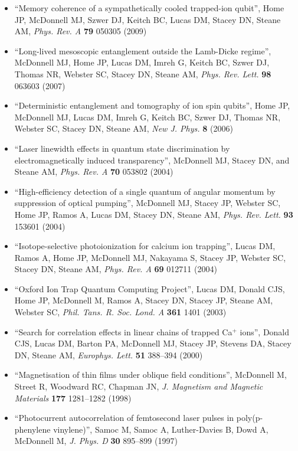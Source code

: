 \documentclass[10pt,a4paper]{article}
\begin{document}
\begin{itemize}
  \item ``Memory coherence of a sympathetically cooled trapped-ion
    qubit'', Home JP, McDonnell MJ, Szwer DJ, Keitch BC, Lucas DM, Stacey DN,
    Steane AM, \textit{Phys. Rev. A} \textbf{79} 050305 (2009)
  \item ``Long-lived mesoscopic entanglement outside the Lamb-Dicke
    regime'', McDonnell MJ, Home JP, Lucas DM, Imreh G, Keitch BC, Szwer DJ,
    Thomas NR, Webster SC, Stacey DN, Steane AM, \textit{Phys. Rev. Lett.}
    \textbf{98} 063603 (2007)
  \item ``Deterministic entanglement and tomography of ion spin qubits'',
    Home JP, McDonnell MJ, Lucas DM, Imreh G, Keitch BC, Szwer DJ, Thomas NR,
    Webster SC, Stacey DN, Steane AM, \textit{New J. Phys.} \textbf{8} (2006)
  \item ``Laser linewidth effects in quantum state discrimination by
    electromagnetically induced transparency'',  McDonnell MJ,
    Stacey DN, and Steane AM, \textit{Phys. Rev. A} \textbf{70}
    053802 (2004) 
  \item ``High-efficiency detection of a single quantum of angular
    momentum by suppression of optical pumping'',  McDonnell MJ,
    Stacey JP, Webster SC, Home JP, Ramos A, Lucas DM, Stacey DN,
    Steane AM, 
    \textit{Phys. Rev. Lett.} \textbf{93} 153601 (2004)
  \item ``Isotope-selective photoionization for calcium ion
    trapping'', Lucas DM, Ramos A, Home JP, McDonnell MJ, Nakayama S,
    Stacey JP, Webster SC, Stacey DN, Steane AM,
    \textit{Phys. Rev. A} \textbf{69} 012711 (2004)
  \item ``Oxford Ion Trap Quantum Computing Project'', Lucas DM, Donald CJS,
    Home JP, McDonnell M, Ramos A, Stacey DN, Stacey JP, Steane AM,
    Webster SC, \textit{Phil. Tans. R. Soc. Lond. A} \textbf{361} 1401
    (2003)
  \item ``Search for correlation effects in linear chains of trapped
    Ca$^{+}$ ions'', Donald CJS, Lucas DM, Barton PA, McDonnell MJ,
    Stacey JP, Stevens DA, Stacey DN, Steane AM,
    \textit{Europhys. Lett.} \textbf{51} 388--394 (2000)
  \item ``Magnetisation of thin films under oblique field
    conditions'', McDonnell M, Street R, Woodward RC, Chapman JN,
    \textit{J. Magnetism and Magnetic Materials} \textbf{177}
    1281--1282 (1998)
  \item ``Photocurrent autocorrelation of femtosecond laser pulses in
    poly(p-phenylene vinylene)'', Samoc M, Samoc A, Luther-Davies B,
    Dowd A, McDonnell M, \textit{J. Phys. D} \textbf{30} 895--899 (1997)
\end{itemize}
\end{document}
